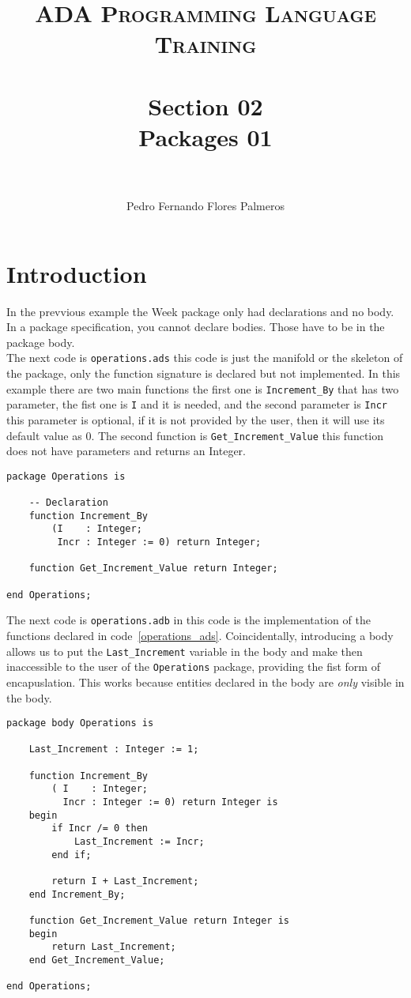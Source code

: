 \documentclass[paper=a4, fontsize=11pt]{scrartcl} %
\title{	
\normalfont \normalsize 
\textsc{ADA Programming Language Training} \\ [25pt] %
\horrule{0.5pt} \\[0.4cm] %
\huge Section 02 \\ Packages 01\\ %
\horrule{2pt} \\[0.5cm] %
}
\author{Pedro Fernando Flores Palmeros} %
\date{} %
\numberwithin{equation}{section} %
\numberwithin{figure}{section} %
\numberwithin{table}{section} %
\begin{document}
\maketitle %
 

\section{Introduction}
In the prevvious example the Week package only had declarations and no body. In a package specification, you cannot declare bodies. Those have to be in the package body.\\

The next code is \verb|operations.ads| this code is just the manifold or the skeleton of the package, only the function signature is declared but not implemented. In this example there are two main functions the first one is \verb|Increment_By| that has two parameter, the fist one is \verb|I| and it is needed, and the second parameter is \verb|Incr| this parameter is optional, if it is not provided by the user, then it will use its default value as 0. The second function is \verb|Get_Increment_Value| this function does not have parameters and returns an Integer.\\

\begin{lstlisting}[caption = {operations.ads}, label = {operations_ads}]
package Operations is 

	-- Declaration 
	function Increment_By
		(I    : Integer;
		 Incr : Integer := 0) return Integer;

	function Get_Increment_Value return Integer;

end Operations;
\end{lstlisting}

The next code is \verb|operations.adb| in this code is the implementation of the functions declared in code~\ref{operations_ads}. Coincidentally, introducing a body allows us to put the \verb|Last_Increment| variable in the body and make then inaccessible to the user of the \verb|Operations| package, providing the fist form of encapuslation. This works because entities declared in the body are \textit{only} visible in the body. \\

\begin{lstlisting}[caption = {operations.adb}]
package body Operations is

	Last_Increment : Integer := 1;

	function Increment_By
		( I    : Integer;
		  Incr : Integer := 0) return Integer is
	begin
		if Incr /= 0 then
			Last_Increment := Incr;
		end if; 

		return I + Last_Increment;
	end Increment_By;

	function Get_Increment_Value return Integer is
	begin 
		return Last_Increment;
	end Get_Increment_Value;
	
end Operations;
\end{lstlisting}
\end{document}
